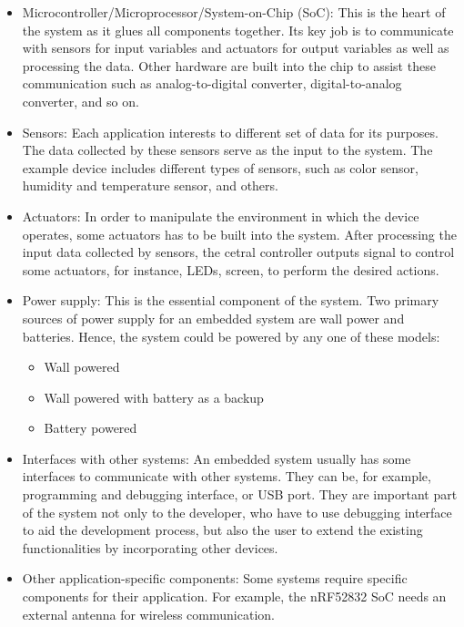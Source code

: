 \begin{itemize}
    \item Microcontroller/Microprocessor/System-on-Chip (SoC): 
        This is the heart of the system as it glues all components together.
        Its key job is to communicate with sensors for input variables and 
        actuators for output variables as well as processing the data. Other 
        hardware are built into the chip to assist these communication such as 
        analog-to-digital converter, digital-to-analog converter, and so on.

    \item Sensors:
        Each application interests to different set of data for its purposes. 
        The data collected by these sensors serve as the input to the system.
        The example device includes different types of sensors, such as color
        sensor, humidity and temperature sensor, and others.
    \item Actuators:
        In order to manipulate the environment in which the device operates,
        some actuators has to be built into the system. After processing the 
        input data collected by sensors, the cetral controller outputs signal 
        to control some actuators, for instance, LEDs, screen, to perform 
        the desired actions.    
    \item Power supply:
        This is the essential component of the system. Two primary sources of 
        power supply for an embedded system are wall power and batteries. Hence,
        the system could be powered by any one of these models:
        \begin{itemize}
            \item Wall powered
            \item Wall powered with battery as a backup
            \item Battery powered
        \end{itemize}
    \item Interfaces with other systems:
        An embedded system usually has some interfaces to communicate with other
        systems. They can be, for example, programming and debugging interface, 
        or USB port. They are important part of the system not only to the developer,
        who have to use debugging interface to aid the development process, but also
        the user to extend the existing functionalities by incorporating other devices.  
    \item Other application-specific components:
        Some systems require specific components for their application. For example, 
        the nRF52832 SoC needs an external antenna for wireless communication.
\end{itemize}

